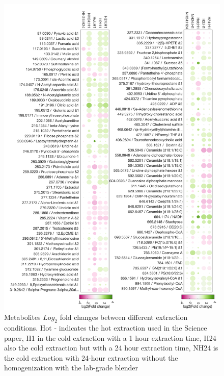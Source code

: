 \documentclass[a4paper,11pt,twoside]{book}
\begin{document}
	\begin{figure}[!ht]
		\centering
		\includegraphics[keepaspectratio,height=.8\textheight]{2.Optimizaiton_Figures/bubbles1.pdf}
		\caption{Metabolites $Log_2$ fold changes between different extraction conditions. Hot - indicates the hot extraction used in the Science paper, H1 in the cold extraction with a 1 hour extraction  time, H24 also the cold extraction but with a 24 hour extraction time, NH24 is the cold extraction with 24-hour extraction without the homogenization with the lab-grade blender}
		\label{fig:Pilor Study 1 Bubble Chart Results}
	\end{figure}
	
\end{document}
